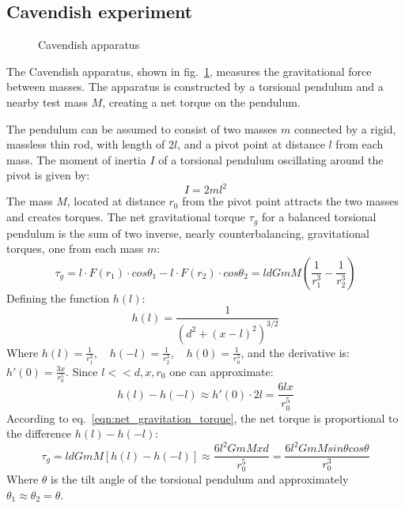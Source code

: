 \documentclass[\main/master.tex]{subfiles}
\begin{document}
\subsection{Cavendish experiment}
\begin{figure}[htbp]
	\centering
	\caption[Cavendish apparatus]{Cavendish apparatus \cite{howell2019}}
	\label{fig:Cavendish apparatus}
\end{figure}
\FloatBarrier
\par\noindent
The Cavendish apparatus, shown in fig.~\ref{fig:Cavendish apparatus}, measures the gravitational force between masses. The apparatus is constructed by a torsional pendulum and a nearby test mass $M$, creating a net torque on the pendulum. 
\par\noindent
The pendulum can be assumed to consist of two masses $m$ connected by a rigid, massless thin rod, with length of $2l$, and a pivot point at distance $l$ from each mass. The moment of inertia $I$ of a torsional pendulum oscillating around the pivot is given by:
\begin{equation}
I = 2ml^2     \label{eqn:moment_inertia}
\end{equation} 
The mass $M$, located at distance $r_0$ from the pivot point attracts the two masses and creates torques. The net gravitational torque $\tau_g$ for a balanced torsional pendulum is the sum of two inverse, nearly counterbalancing, gravitational torques, one from each mass $m$:
\begin{equation}
\tau_g = l \cdot F(r_1) \cdot cos\theta_1 - l \cdot F(r_2) \cdot cos\theta_2 = l d GmM(\frac{1}{r_1^3} - \frac{1}{r_2^3})     \label{eqn:net_gravitation_torque}
\end{equation}
Defining the function $h(l)$:
\begin{equation}
h(l) = \frac{1}{(d^2 +(x-l)^2)^{3/2}} \label{eqn:gravitation torque func}
\end{equation}
Where $h(l) = \frac{1}{r_1^3},\quad	h(-l) = \frac{1}{r_2^3},\quad	h(0) = \frac{1}{r_0^3}$, and the derivative is: $h'(0) = \frac{3x}{r_0^5}$. Since $l<<d,x,r_0$ one can approximate:
\begin{equation}
h(l)-h(-l)\approx h'(0)\cdot 2l = \frac{6lx}{r_0^5}\label{eqn:approximation}
\end{equation}
According to eq.~\ref{eqn:net_gravitation_torque}, the net torque is proportional to the difference $h(l)-h(-l)$:
\begin{equation}
\tau_g = l d GmM[h(l)-h(-l)]\approx \frac{6l^2GmMxd} {r_0^5} = \frac{6l^2GmM sin\theta cos\theta}{r_0^3}      
\label{eqn:net_gravitation_torque_approx}
\end{equation}
Where $\theta$ is the tilt angle of the torsional pendulum and approximately $\theta_1 \approx \theta_2 = \theta$.
\end{document}
